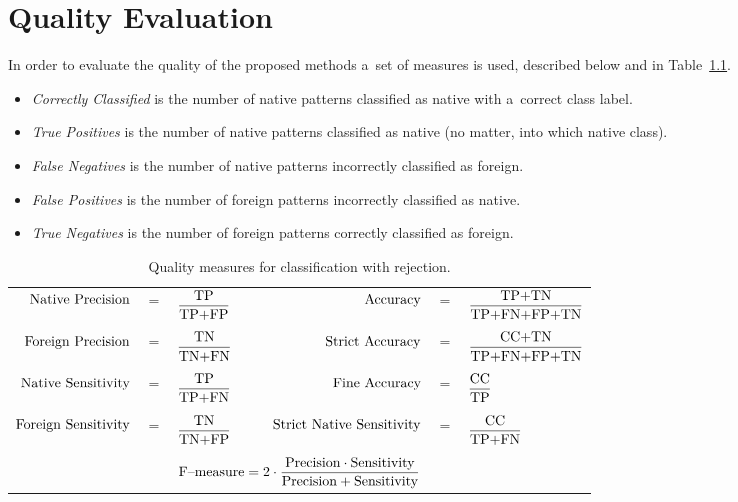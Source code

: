\chapter{Quality Evaluation} \label{quality_measures}

In order to evaluate the quality of the proposed methods a~set of measures is used, described below and in Table~\ref{tab:measures}.
\begin{itemize}
	\item \emph{Correctly Classified} is the number of native patterns classified as native with a~correct class label.
	\item \emph{True Positives} is the number of native patterns classified as native (no matter, into which native class).
	\item \emph{False Negatives} is the number of native patterns incorrectly classified as foreign.
	\item \emph{False Positives} is the number of foreign patterns incorrectly classified as native.
	\item \emph{True Negatives} is the number of foreign patterns correctly classified as foreign.
\end{itemize}  


\begin{table}[!h]
	\centering
	\caption{Quality measures for classification with rejection.}
	\vspace{6pt}
	{\footnotesize
		\begin{tabular}{rclrcl}
			$\textnormal{Native Precision}$ &$=$& $\displaystyle\frac{\textnormal{TP}}{\textnormal{TP+FP}}$ & 
			$\textnormal{Accuracy}$ &$=$& $\displaystyle\frac{\textnormal{TP+TN}}{\textnormal{TP+FN+FP+TN}}$ \\
			&&&&&\vspace{-3pt}\\
			$\textnormal{Foreign Precision}$ &$=$& $\displaystyle\frac{\textnormal{TN}}{\textnormal{TN+FN}}$ &
			$\textnormal{Strict Accuracy}$ &$=$& $\displaystyle\frac{\textnormal{CC+TN}}{\textnormal{TP+FN+FP+TN}}$ \\
			&&&&&\vspace{-3pt}\\
			$\textnormal{Native Sensitivity}$ &$=$& $\displaystyle\frac{\textnormal{TP}}{\textnormal{TP+FN}}$ &
			$\textnormal{Fine Accuracy}$ &$=$& $\displaystyle\frac{\textnormal{CC}}{\textnormal{TP}}$ \\
			&&&&&\vspace{-3pt}\\
			$\textnormal{Foreign Sensitivity}$ &$=$& $\displaystyle\frac{\textnormal{TN}}{\textnormal{TN+FP}}$ &
			$\hspace{18pt}\textnormal{Strict Native Sensitivity}$ &$=$& $\displaystyle\frac{\textnormal{CC}}{\textnormal{TP+FN}}$\\
			&&&&&\vspace{-3pt}\\
			\multicolumn{6}{c}{$\textnormal{F--measure}=2\cdot\displaystyle\frac{\textnormal{Precision}\cdot\textnormal{Sensitivity}}{\textnormal{Precision}+\textnormal{Sensitivity}}$}
		\end{tabular}
	}
	\label{tab:measures}
	\vspace{-12pt}
\end{table}